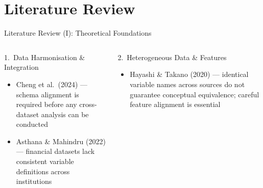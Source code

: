 \documentclass[9pt,aspectratio=169]{beamer}
\begin{document}

\section{Literature Review}

\begin{frame}{Literature Review (I): Theoretical Foundations}
\vspace{-4pt}
\begin{columns}[T]
    \begin{block}{1.\ Data Harmonisation \& Integration}
      \footnotesize
      \begin{itemize}\setlength\itemsep{2pt}
        \item Cheng et al.\ (2024) --- schema alignment is required before
              any cross-dataset analysis can be conducted
        \item Asthana \& Mahindru (2022) --- financial datasets lack
              consistent variable definitions across institutions
      \end{itemize}
    \end{block}
    \vspace{5pt}
    \begin{block}{2.\ Heterogeneous Data \& Features}
      \footnotesize
      \begin{itemize}\setlength\itemsep{2pt}
        \item Hayashi \& Takano (2020) --- identical variable names across
              sources do not guarantee conceptual equivalence; careful
              feature alignment is essential
      \end{itemize}
    \end{block}


\end{columns}
\end{frame}
\end{document}
